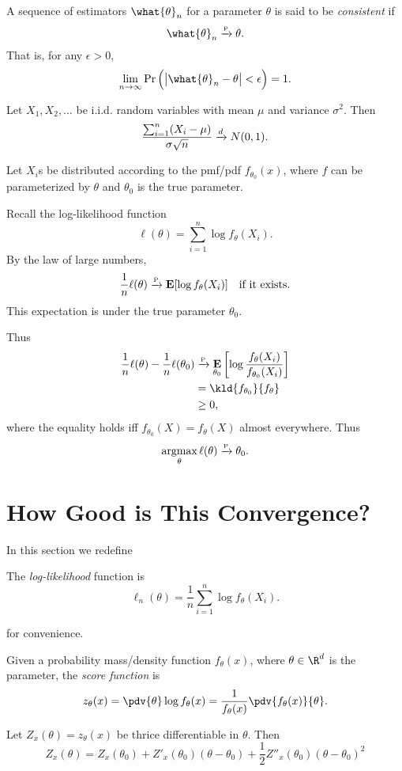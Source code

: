 
\begin{definition}[Consistency] \label{def:mle:consistency}
    A sequence of estimators $\what{\theta}_n$ for a parameter $\theta$
    is said to be \emph{consistent} if \[
        \what{\theta}_n \pto \theta.
    \] That is, for any $\epsilon > 0$, \[
        \lim_{n \to \infty}
            \Pr\Big(\big|{\what{\theta}_n - \theta}\big| < \epsilon \Big)
        = 1.
    \]
\end{definition}

\begin{theorem} \label{thm:mle:clt}
    Let $X_1, X_2, \ldots$ be i.i.d. random variables with mean $\mu$
    and variance $\sigma^2$.
    Then \[
        \frac{\sum_{i=1}^n (X_i - \mu)}{\sigma \sqrt{n}}
        \xrightarrow{d} N(0, 1).
    \]
\end{theorem}

Let $X_i$s be distributed according to the pmf/pdf $f_{\theta_0}(x)$, where
$f$ can be parameterized by $\theta$ and $\theta_0$ is the true parameter.

Recall the log-likelihood function \[
    \ell(\theta) = \sum_{i=1}^n \log f_\theta(X_i).
\] By the law of large numbers, \[
    \frac1n \ell(\theta)
        \xrightarrow{\text{\tiny P}} \operatorname*{\textbf{E}}[\log f_\theta(X_i)] \quad\text{if it exists.}
\] This expectation is under the true parameter $\theta_0$.

Thus \begin{align*}
    \frac1n \ell(\theta) - \frac1n \ell(\theta_0)
        &\pto \E_{\theta_0}\left[\log \frac{f_\theta(X_i)}{f_{\theta_0}(X_i)}\right] \\
        &= \kld{f_{\theta_0}}{f_\theta} \\
        &\ge 0,
\end{align*} where the equality holds iff $f_{\theta_0}(X) = f_\theta(X)$
almost everywhere.
Thus \[
    \operatorname*{argmax}_\theta \ell(\theta)
        \xrightarrow{\text{\tiny P}} \theta_0.
\]

\section{How Good is This Convergence?} \label{sec:mle:convergence}
In this section we redefine
\begin{definition} \label{def:mle:log-likelihood}
    The \emph{log-likelihood} function is \[
        \ell_n(\theta) = \frac1n \sum_{i=1}^n \log f_\theta(X_i).
    \]
\end{definition}
for convenience.

\begin{definition} \label{def:mle:convergence:score}
    Given a probability mass/density function $f_\theta(x)$,
    where $\theta \in \R^d$ is the parameter, the \emph{score function} is
    \[
        z_\theta(x) = \pdv{\theta} \log f_\theta(x)
               = \frac1{f_\theta(x)} \pdv{f_\theta(x)}{\theta}.
    \]
\end{definition}
Let $Z_x(\theta) = z_\theta(x)$ be thrice differentiable in $\theta$.
Then \[
    Z_x(\theta) = Z_x(\theta_0) + Z'_x(\theta_0)(\theta - \theta_0)
        + \frac12 Z''_x(\theta_0)(\theta - \theta_0)^2
\]
